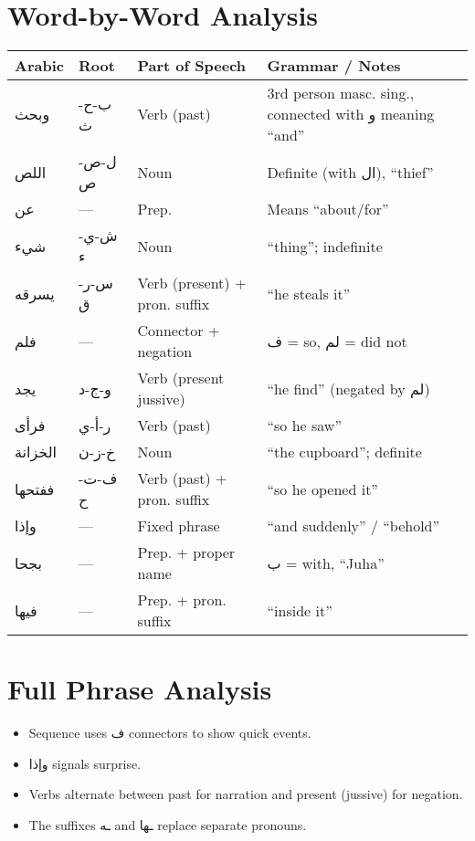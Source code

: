 \documentclass[a4paper,12pt]{article}
\begin{document}
\section{Word-by-Word Analysis}
\renewcommand{\arraystretch}{1.4}
\begin{tabular}{|>{\arabicfont}m{2.5cm}|m{2.5cm}|m{3cm}|m{6cm}|}
\hline
\rowcolor{tableheader} Arabic & Root & Part of Speech & Grammar / Notes \\
\hline
وبحث & ب-ح-ث & Verb (past) & 3rd person masc. sing., connected with \textarabic{و} meaning “and” \\
اللص & ل-ص-ص & Noun & Definite (with \textarabic{ال}), “thief” \\
عن & --- & Prep. & Means “about/for” \\
شيء & ش-ي-ء & Noun & “thing”; indefinite \\
يسرقه & س-ر-ق & Verb (present) + pron. suffix & “he steals it” \\
فلم & --- & Connector + negation & \textarabic{ف} = so, \textarabic{لم} = did not \\
يجد & و-ج-د & Verb (present jussive) & “he find” (negated by \textarabic{لم}) \\
فرأى & ر-أ-ي & Verb (past) & “so he saw” \\
الخزانة & خ-ز-ن & Noun & “the cupboard”; definite \\
ففتحها & ف-ت-ح & Verb (past) + pron. suffix & “so he opened it” \\
وإذا & --- & Fixed phrase & “and suddenly” / “behold” \\
بجحا & --- & Prep. + proper name & \textarabic{ب} = with, “Juha” \\
فيها & --- & Prep. + pron. suffix & “inside it” \\
\hline
\end{tabular}

\section{Full Phrase Analysis}
\begin{itemize}[noitemsep]
    \item Sequence uses \textarabic{ف} connectors to show quick events.
    \item \textarabic{وإذا} signals surprise.
    \item Verbs alternate between past for narration and present (jussive) for negation.
    \item The suffixes \textarabic{ـه} and \textarabic{ـها} replace separate pronouns.
\end{itemize}
\end{document}
